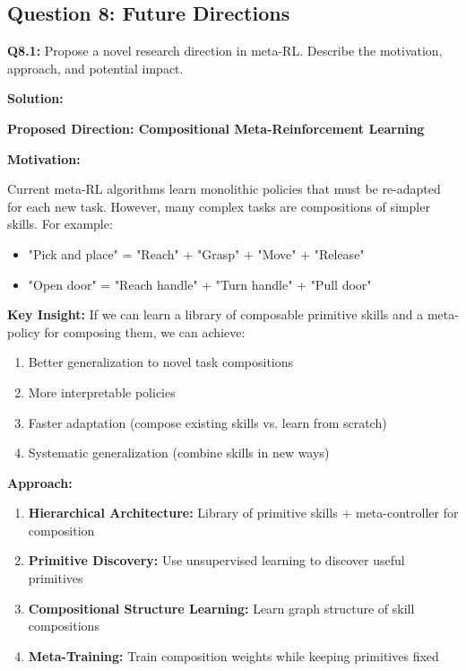\documentclass[12pt]{article}
\begin{document}
{{			\subsection{Question 8: Future Directions}
			
			\textbf{Q8.1:} Propose a novel research direction in meta-RL. Describe the motivation, approach, and potential impact.
			
			\textbf{Solution:}
			
			\textbf{Proposed Direction: Compositional Meta-Reinforcement Learning}
			
			\textbf{Motivation:}
			
			Current meta-RL algorithms learn monolithic policies that must be re-adapted for each new task. However, many complex tasks are compositions of simpler skills. For example:
			
			\begin{itemize}
				\item "Pick and place" = "Reach" + "Grasp" + "Move" + "Release"
				\item "Open door" = "Reach handle" + "Turn handle" + "Pull door"
			\end{itemize}
			
			\textbf{Key Insight:} If we can learn a library of composable primitive skills and a meta-policy for composing them, we can achieve:
			
			\begin{enumerate}
				\item Better generalization to novel task compositions
				\item More interpretable policies
				\item Faster adaptation (compose existing skills vs. learn from scratch)
				\item Systematic generalization (combine skills in new ways)
			\end{enumerate}
			
			\textbf{Approach:}
			
			\begin{enumerate}
				\item \textbf{Hierarchical Architecture:} Library of primitive skills + meta-controller for composition
				\item \textbf{Primitive Discovery:} Use unsupervised learning to discover useful primitives
				\item \textbf{Compositional Structure Learning:} Learn graph structure of skill compositions
				\item \textbf{Meta-Training:} Train composition weights while keeping primitives fixed
			\end{enumerate}
			
}}
\end{document}
